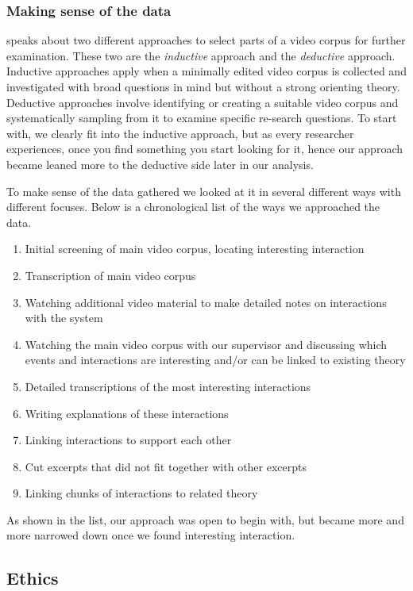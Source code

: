 \subsubsection{Making sense of the data}
\citeauthor{derry2010conducting} speaks about two different approaches to select parts of a video corpus for further examination. These two are the \emph{inductive} approach and the \emph{deductive} approach. Inductive approaches apply when a minimally edited video corpus is collected and investigated with broad questions in mind but without a strong orienting theory. Deductive approaches involve identifying or creating a suitable video corpus and systematically sampling from it to examine specific re-search questions. \citep{derry2010conducting} To start with, we clearly fit into the inductive approach, but as every researcher experiences, once you find something you start looking for it, hence our approach became leaned more to the deductive side later in our analysis.

To make sense of the data gathered we looked at it in several different ways with different focuses. Below is a chronological list of the ways we approached the data. 


\begin{enumerate}
\item{Initial screening of main video corpus, locating interesting interaction}
\item{Transcription of main video corpus}
\item{Watching additional video material to make detailed notes on interactions with the system}
\item{Watching the main video corpus with our supervisor and discussing which events and interactions are interesting and/or can be linked to existing theory}
\item{Detailed transcriptions of the most interesting interactions}
\item{Writing explanations of these interactions}
\item{Linking interactions to support each other}
\item{Cut excerpts that did not fit together with other excerpts}
\item{Linking chunks of interactions to related theory}
\end{enumerate}

As shown in the list, our approach was open to begin with, but became more and more narrowed down once we found interesting interaction. 


\subsection{Ethics}




